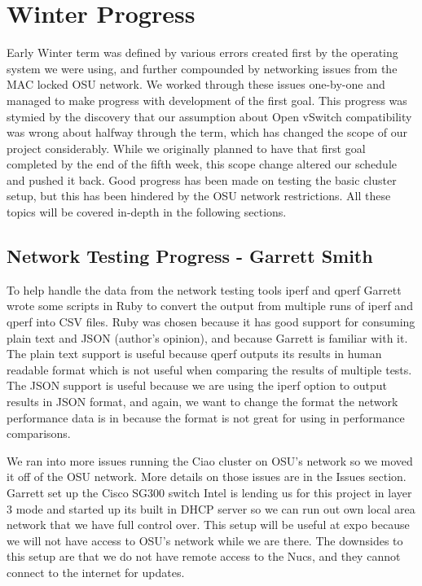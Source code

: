 \documentclass[10pt,onecolumn,journal,draftclsnofoot]{IEEEtran}
\begin{document}
\section{Winter Progress}
Early Winter term was defined by various errors created first by the operating
system we were using, and further compounded by networking issues from the MAC
locked OSU network. We worked through these issues one-by-one and managed to
make progress with development of the first goal. This progress was stymied by
the discovery that our assumption about Open vSwitch compatibility was wrong
about halfway through the term, which has changed the scope of our project
considerably. While we originally planned to have that first goal completed by
the end of the fifth week, this scope change altered our schedule and pushed it
back. Good progress has been made on testing the basic cluster setup, but this
has been hindered by the OSU network restrictions. All these topics will be
covered in-depth in the following sections.

\subsection{Network Testing Progress - Garrett Smith}
To help handle the data from the network testing tools iperf and qperf Garrett
wrote some scripts in Ruby to convert the output from multiple runs of iperf and
qperf into CSV files. Ruby was chosen because it has good support for consuming
plain text and JSON (author's opinion), and because Garrett is familiar with it.
The plain text support is useful because qperf outputs its results in human
readable format which is not useful when comparing the results of multiple
tests.  The JSON support is useful because we are using the iperf option to
output results in JSON format, and again, we want to change the format the
network performance data is in because the format is not great for using in
performance comparisons.

We ran into more issues running the Ciao cluster on OSU's network so we moved it
off of the OSU network. More details on those issues are in the Issues section.
Garrett set up the Cisco SG300 switch Intel is lending us for this project in
layer 3 mode and started up its built in DHCP server so we can run out own local
area network that we have full control over.  This setup will be useful at expo
because we will not have access to OSU's network while we are there.  The
downsides to this setup are that we do not have remote access to the Nucs, and
they cannot connect to the internet for updates.
\end{document}
